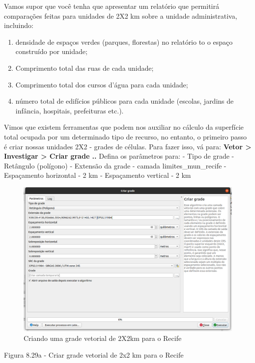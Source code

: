 \documentclass[
]{krantz}
\providecommand{\tightlist}{%
  \setlength{\itemsep}{0pt}\setlength{\parskip}{0pt}}
\begin{document}
Vamos supor que você tenha que apresentar um relatório que permitirá comparações feitas para unidades de 2X2 km sobre a unidade administrativa, incluindo:

\begin{enumerate}
\def\labelenumi{\arabic{enumi}.}
\tightlist
\item
  densidade de espaços verdes (parques, florestas) no relatório to o espaço construído por unidade;
\item
  Comprimento total das ruas de cada unidade;
\item
  Comprimento total dos cursos d'água para cada unidade;
\item
  número total de edifícios públicos para cada unidade (escolas, jardins de infância, hospitais, prefeituras etc.).
\end{enumerate}

Vimos que existem ferramentas que podem nos auxiliar no cálculo da superfície total ocupada por um determinado tipo de recurso, no entanto, o primeiro passo é criar nossas unidades 2X2 - grades de células. Para fazer isso, vá para: \textbf{Vetor \textgreater{} Investigar \textgreater{} Criar grade ..} Defina os parâmetros para:
- Tipo de grade - Retângulo (polígono)
- Extensão da grade - camada limites\_mun\_recife
- Espaçamento horizontal - 2 km
- Espaçamento vertical - 2 km

\begin{figure}
\centering
\includegraphics{media/modulo8/fig829_a.png}
\caption{Criando uma grade vetorial de 2X2km para o Recife}
\end{figure}

Figura 8.29a - Criar grade vetorial de 2x2 km para o Recife
\end{document}
